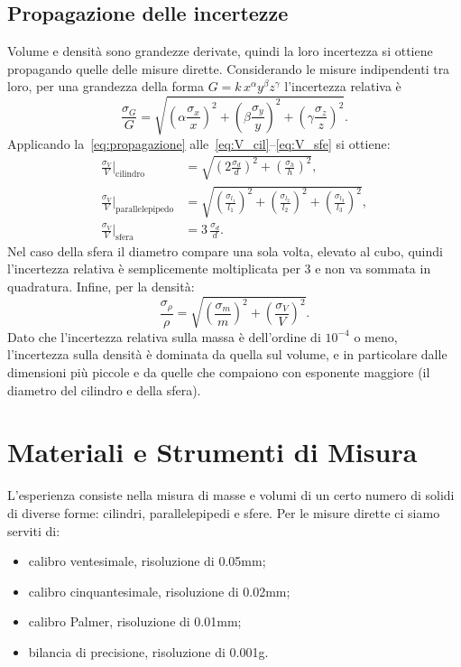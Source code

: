 \documentclass[a4paper]{article}
\begin{document}
\subsection{Propagazione delle incertezze}
Volume e densit\`a sono grandezze derivate, quindi la loro incertezza si ottiene propagando quelle delle misure dirette.
Considerando le misure indipendenti tra loro, per una grandezza della forma $G = k\, x^{\alpha} y^{\beta} z^{\gamma}$ l'incertezza relativa \`e
\begin{equation}
    \frac{\sigma_G}{G} = \sqrt{\left(\alpha\frac{\sigma_x}{x}\right)^2 + \left(\beta\frac{\sigma_y}{y}\right)^2 + \left(\gamma\frac{\sigma_z}{z}\right)^2}.
    \label{eq:propagazione}
\end{equation}
Applicando la~\eqref{eq:propagazione} alle~\eqref{eq:V_cil}--\eqref{eq:V_sfe} si ottiene:
\begin{align}
    \frac{\sigma_V}{V}\bigg|_{\text{cilindro}} &= \sqrt{\left(2\frac{\sigma_d}{d}\right)^2 + \left(\frac{\sigma_h}{h}\right)^2},\\
    \frac{\sigma_V}{V}\bigg|_{\text{parallelepipedo}} &= \sqrt{\left(\frac{\sigma_{l_1}}{l_1}\right)^2 + \left(\frac{\sigma_{l_2}}{l_2}\right)^2 + \left(\frac{\sigma_{l_3}}{l_3}\right)^2},\\
    \frac{\sigma_V}{V}\bigg|_{\text{sfera}} &= 3\,\frac{\sigma_d}{d}.
\end{align}
Nel caso della sfera il diametro compare una sola volta, elevato al cubo, quindi l'incertezza relativa \`e semplicemente moltiplicata per 3 e non va sommata in quadratura.
Infine, per la densit\`a:
\begin{equation}
    \frac{\sigma_\rho}{\rho} = \sqrt{\left(\frac{\sigma_m}{m}\right)^2 + \left(\frac{\sigma_V}{V}\right)^2}.
    \label{eq:sigma_rho}
\end{equation}
Dato che l'incertezza relativa sulla massa \`e dell'ordine di $10^{-4}$ o meno, l'incertezza sulla densit\`a \`e dominata da quella sul volume, e in particolare dalle dimensioni pi\`u piccole e da quelle che compaiono con esponente maggiore (il diametro del cilindro e della sfera).

\section{Materiali e Strumenti di Misura}
L'esperienza consiste nella misura di masse e volumi di un certo numero di solidi di diverse forme: cilindri, parallelepipedi e sfere. Per le misure dirette ci siamo serviti di:
\begin{itemize}
    \item calibro ventesimale, risoluzione di 0.05mm;
    \item calibro cinquantesimale, risoluzione di 0.02mm;
    \item calibro Palmer, risoluzione di 0.01mm;
    \item bilancia di precisione, risoluzione di 0.001g.
\end{itemize}
\end{document}
